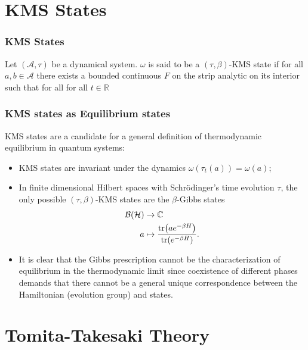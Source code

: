 \documentclass{beamer}
\begin{document}
\section{KMS States}

\begin{frame}[fragile]
	\frametitle{KMS States}
	\begin{definition}
		Let $(\mathcal{A},\tau)$ be a dynamical system. $\omega$ is said to be a $(\tau,\beta)$-KMS state if for all $a,b\in\mathcal{A}$ there exists a bounded continuous $F$ on the strip analytic on its interior such that for all for all $t\in\mathbb{R}$
		\begin{figure}
		\end{figure}
	\end{definition}
\end{frame}

\begin{frame}
	\frametitle{KMS states as Equilibrium states}	
	KMS states are a candidate for a general definition of thermodynamic equilibrium in quantum systems\cite{Haag1967}:
	\begin{itemize}
		\item KMS states are invariant under the dynamics $\omega(\tau_t(a))=\omega(a)$;
		\item In finite dimensional Hilbert spaces with Schrödinger's time evolution $\tau$, the only possible $(\tau,\beta)$-KMS states are the $\beta$-Gibbs states
		\begin{align*}
			\mathcal{B}(\mathcal{H})&\rightarrow\mathbb{C} \\
			a&\mapsto \frac{\tr(ae^{-\beta H})}{\tr(e^{-\beta H})}.
		\end{align*}
		\item It is clear that the Gibbs prescription cannot be the characterization of equilibrium in the thermodynamic limit since coexistence of different phases demands that there cannot be a general unique correspondence between the Hamiltonian (evolution group) and states\cite{Connes1994}.
	\end{itemize}
\end{frame}

\section{Tomita-Takesaki Theory}
\end{document}
